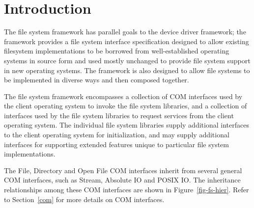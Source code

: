 %
% 
%

\label{fs}

\section{Introduction}

	The \oskit{} file system framework has parallel goals to the \oskit{}
device driver framework; the framework provides a file system
interface specification designed to allow existing filesystem
implementations to be borrowed from well-established operating systems
in source form and used mostly unchanged to provide file system
support in new operating systems.  The framework is also designed to
allow file systems to be implemented in diverse ways and then composed
together.

	The \oskit{} file system framework encompasses a collection of COM
interfaces used by the client operating system to invoke the file
system libraries, and a collection of interfaces used by the file
system libraries to request services from the client operating system.
The individual file system libraries supply additional interfaces to
the client operating system for initialization, and may supply
additional interfaces for supporting extended features unique to
particular file system implementations.

	The \oskit{} File,
Directory and Open File COM interfaces inherit from several general COM
interfaces, such as Stream, Absolute IO and POSIX IO\@.  The inheritance
relationships among these COM interfaces are shown in Figure~\ref{fig-fs-hier}.
Refer to Section~\ref{com} for more details on COM interfaces.



